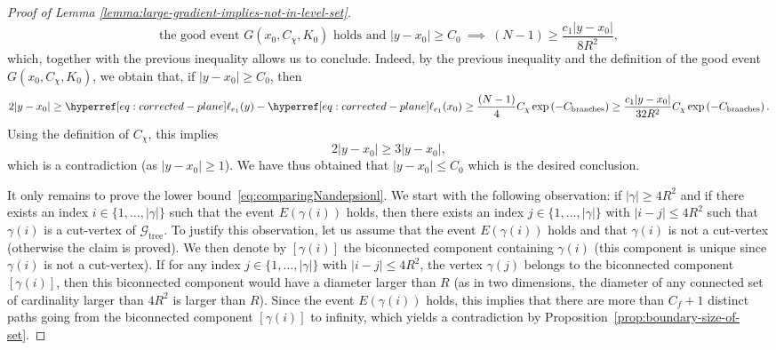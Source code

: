 \documentclass[12pt]{amsart}
\numberwithin{equation}{section}
\begin{document}
\begin{proof}[Proof of Lemma \ref{lemma:large-gradient-implies-not-in-level-set}]
		\begin{equation} \label{eq:comparingNandepsionl}  \mbox{the good event } G(x_0, C_\chi, K_0) \mbox{ holds and } |y - x_0| \geq C_0 ~ \implies ~  (N-1) \geq \frac{c_1 |y-x_0|}{8 R^2},
		\end{equation}
		which, together with the previous inequality allows us to conclude. Indeed, by the previous inequality and the definition of the good event $G(x_0 , C_\chi, K_0)$, we obtain that, if $|y-x_0| \geq C_0$, then
		\begin{equation*}
			2 |y-x_0| \geq  \ellp{e_1}(y) - \ellp{e_1}(x_0) \geq \frac{(N-1)}{4} C_{\chi} \exp \left( -C_{\mathrm{branches}} \right) \geq \frac{c_1 |y-x_0|}{32 R^2} C_{\chi} \exp \left( -C_{\mathrm{branches}} \right).
		\end{equation*}
		Using the definition of $C_\chi$, this implies
		\begin{equation*}
			2 |y-x_0|  \geq 3 |y-x_0|,
		\end{equation*}
		which is a contradiction (as $|y-x_0| \geq 1$). We have thus obtained that $|y-x_0| \leq C_0$ which is the desired conclusion.
		
		It only remains to prove the lower bound~\eqref{eq:comparingNandepsionl}. We start with the following observation: if $\left| \gamma \right| \geq 4R^2$ and if there exists an index $i \in \{ 1 , \ldots, \left|  \gamma \right| \}$ such that the event $E(\gamma(i))$ holds, then there exists an index $j \in \{ 1 , \ldots, \left|  \gamma \right| \}$ with $|i - j| \leq 4 R^2$ such that $\gamma(i)$ is a cut-vertex of $\mathcal{G}_{\mathrm{tree}}$. To justify this observation, let us assume that the event $E(\gamma(i))$ holds and that $\gamma (i)$ is not a cut-vertex (otherwise the claim is proved). We then denote by $[\gamma(i)]$ the biconnected component containing $\gamma(i)$ (this component is unique since $\gamma(i)$ is not a cut-vertex). If for any index $j \in \{ 1 , \ldots, \left|  \gamma \right| \}$ with $|i - j| \leq 4 R^2$, the vertex $\gamma(j)$ belongs to the biconnected component $[\gamma(i)]$, then this biconnected component would have a diameter larger than $R$ (as in two dimensions, the diameter of any connected set of cardinality larger than $4R^2$ is larger than $R$). Since the event $E(\gamma(i))$ holds, this implies that there are more than $C_f+1$ distinct paths going from the biconnected component $[\gamma(i)]$ to infinity, which yields a contradiction by Proposition~\ref{prop:boundary-size-of-set}. 
		

\end{proof}
\end{document}
